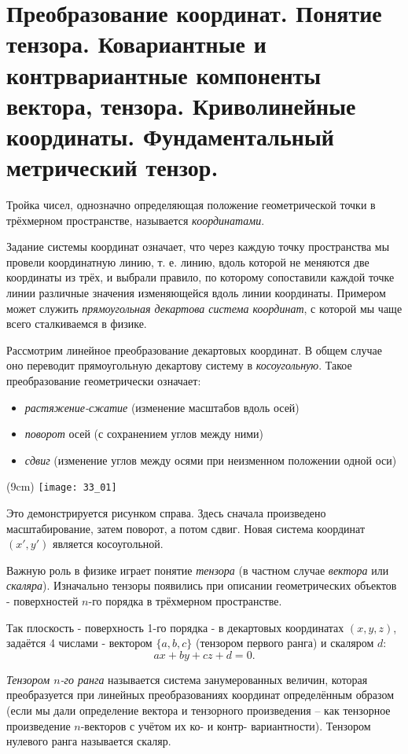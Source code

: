 \chapter{Преобразование координат. Понятие тензора. Ковариантные и
контрвариантные компоненты вектора, тензора. Криволинейные координаты.
Фундаментальный метрический тензор.}

Тройка чисел, однозначно определяющая положение геометрической точки в
трёхмерном пространстве, называется \emph{координатами}. 

Задание системы координат означает, что через каждую точку пространства мы
провели координатную линию, т. е. линию, вдоль которой не меняются две
координаты из трёх, и выбрали правило, по которому сопоставили каждой точке
линии различные значения изменяющейся вдоль линии координаты. Примером может
служить \emph{прямоугольная декартова система координат}, с которой мы чаще
всего сталкиваемся в физике.

Рассмотрим линейное преобразование декартовых координат. В общем случае оно
переводит прямоугольную декартову систему в \emph{косоугольную}. Такое
преобразование геометрически означает:
    \begin{itemize}
        \item \emph{растяжение-сжатие} (изменение масштабов вдоль осей)
        \item \emph{поворот} осей (с сохранением углов между ними)
        \item \emph{сдвиг} (изменение углов между осями при неизменном
            положении одной оси)
    \end{itemize}
    
\sidefig(9cm)
{\texttt{[image: 33\_01]}}{Это демонстрируется рисунком справа.
Здесь сначала произведено масштабирование, затем поворот, а потом сдвиг. Новая
система координат \( (x', y') \) является косоугольной.

Важную роль в физике играет понятие \emph{тензора} (в частном случае
\emph{вектора} или \emph{скаляра}). Изначально тензоры появились при описании
геометрических объектов - поверхностей \( n \)-го порядка в трёхмерном
пространстве.
}

Так плоскость - поверхность 1-го порядка - в декартовых координатах
\( (x, y, z) \), задаётся 4 числами - вектором \( \{a,b,c\} \) (тензором
первого ранга) и скаляром \( d \):
\[
    ax+by+cz+d=0.
\]

\emph{Тензором \( n \)-го ранга} называется система занумерованных величин,
которая преобразуется при линейных преобразованиях координат определённым
образом (если мы дали определение вектора и тензорного произведения -- как
тензорное произведение \( n \)-векторов с учётом их ко- и контр- вариантности).
Тензором нулевого ранга называется скаляр.

